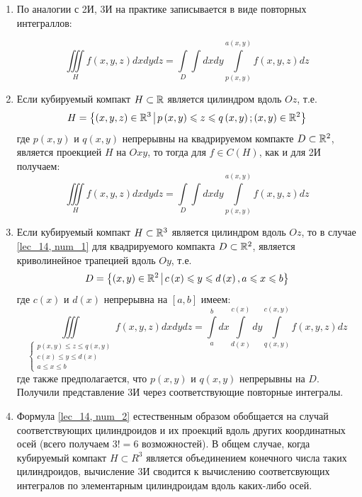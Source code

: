 \documentclass[../../main.tex]{subfiles}
\begin{document}
	\begin{rems}
		\quad
		\begin{enumerate}
			\item По аналогии с 2И, 3И на практике записывается в виде повторных интеграллов:
			
			\begin{equation}
			\iiint\limits_{H} f \left( x, y, z \right) dx dy dz = \int\limits_{D}\int dx dy \int\limits_{p\left(x, y\right)}^{a\left(x, y \right)} f\left(x, y, z\right) dz \label{lec_14, num_1}
			\end{equation}
			
			\item Если кубируемый компакт $H \subset \mathbb{R}$ является цилиндром вдоль $Oz$, т.е. 
			\[H = \left\{\left(x, y, z \right) \in \R^3 \; \vline \; p \left(x, y\right) \leq z \leq q \left(x, y \right) ; \left(x, y\right) \in \R^2 \right\} \]
			где $p\left(x, y\right)$ и $q\left(x, y\right)$ непрерывны на квадрируемом компакте $D \subset \mathbb{R}^2$, является проекцией $H$ на $Oxy$, то тогда для $f \in C\left(H\right)$, как и для 2И получаем:
			\[\iiint\limits_{H} f \left( x, y, z \right) dx dy dz = \int\limits_{D}\int dx dy \int\limits_{p\left(x, y\right)}^{a\left(x, y \right)} f\left(x, y, z\right) dz\]
			
			\item Если кубируемый компакт $H \subset \mathbb{R}^3$ является цилиндром вдоль $Oz$, то в случае \eqref{lec_14, num_1} для квадрируемого компакта $D \subset \mathbb{R}^2$, является криволинейное трапецией вдоль $Oy$, т.е.
			\[D = \left\{\left(x, y\right) \in \R^2 \; \vline \; c \left(x\right) \leq y \leq d \left(x \right), a \leq x \leq b \right\} \]
			где $c(x)$ и $d(x)$ непрерывна на $\left[a, b\right]$ имеем:
			\begin{equation}
			\iiint\limits_{\begin{cases}
				p\left(x, y\right) \leq z \leq q\left(x, y\right)\\
				c\left(x\right) \leq y \leq d\left(x\right)\\
				a \leq x \leq b
				\end{cases}} f \left( x, y, z \right) dx dy dz = \int\limits_{a}^{b} dx \int\limits_{d\left(x\right)}^{c\left(x\right)} dy \int\limits_{q\left(x, y\right)}^{c\left(x, y\right)} f(x, y, z) dz \label{lec_14, num_2}
			\end{equation}
			где также предполагается, что $p\left(x, y\right)$ и $q\left(x, y\right)$ непрерывны на $D$.
			Получили представление 3И через соответствующие повторные интегралы.
			
			\item Формула \eqref{lec_14, num_2} естественным образом обобщается на случай соответствующих цилиндроидов и их проекций вдоль других координатных осей (всего получаем $3! = 6$ возможностей). В общем случае, когда кубируемый компакт $H \subset R^3$ является объединением конечного числа таких цилиндроидов, вычисление 3И сводится к вычислению соответсвующих интегралов по элементарным цилиндроидам вдоль каких-либо осей.  
		\end{enumerate}
	\end{rems}
\end{document}
